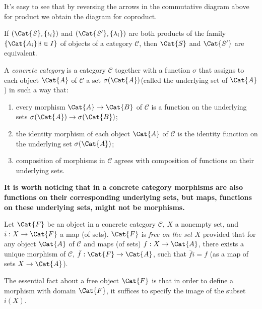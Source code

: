 It's easy to see that by reversing the arrows in the commutative diagram above for product we obtain the diagram for coproduct. 
\begin{theorem}
		If $ (\Cat{S},\{\iota_i \}) $ and $ (\Cat{S^\prime},\{\lambda_i\}) $ are both products of the family $ \{\Cat{A_i}|i\in I  \} $ of objects of a category $ \mathscr{C} $, then $ \Cat{S} $ and $ \Cat{S^{\prime}} $ are equivalent. 
\end{theorem}
\begin{definition}
	A \textit{concrete category} is a category $ \mathscr{C} $ together with a function $ \sigma $ that assigns to each object $ \Cat{A} $ of $ \mathscr{C} $ a set $ \sigma(\Cat{A}) $(called the underlying set of $ \Cat{A} $) in such a way that:
	\begin{enumerate}
		\item every morphism $ \Cat{A} \to \Cat{B} $ of $ \mathscr{C} $ is a function on the underlying sets $ \sigma(\Cat{A})\to \sigma(\Cat{B}) $;
		\item the identity morphism of each object $ \Cat{A} $ of $ \mathscr{C} $ is the identity function on the underlying set $ \sigma(\Cat{A}) $;
		\item composition of morphisms in $ \mathscr{C} $ agrees with composition of functions on their underlying sets.
	\end{enumerate}
\end{definition}
\textbf{It is worth noticing that in a concrete category morphisms are also functions on their corresponding underlying sets, but maps, functions on these underlying sets, might not be morphisms.}
\begin{definition}
	Let $ \Cat{F} $ be an object in a concrete category $ \mathscr{C} $, $ X $ a nonempty set, and $ i:X \to \Cat{F} $ a map (of sets). $ \Cat{F} $ is \textit{free on the set $ X $} provided that for any object $ \Cat{A} $ of $ \mathscr{C} $ and maps (of sets) $ f:X \to \Cat{A} $, there exists a unique morphism of $ \mathscr{C} $, $ \bar{f}:\Cat{F}\to \Cat{A} $, such that $ \bar{f}i=f $ (as a map of sets $ X \to \Cat{A} $).
\end{definition}
\newpara
The essential fact about a free object $ \Cat{F} $ is that in order to define a morphism with domain $ \Cat{F} $, it suffices to specify the image of the subset $ i(X) $.
